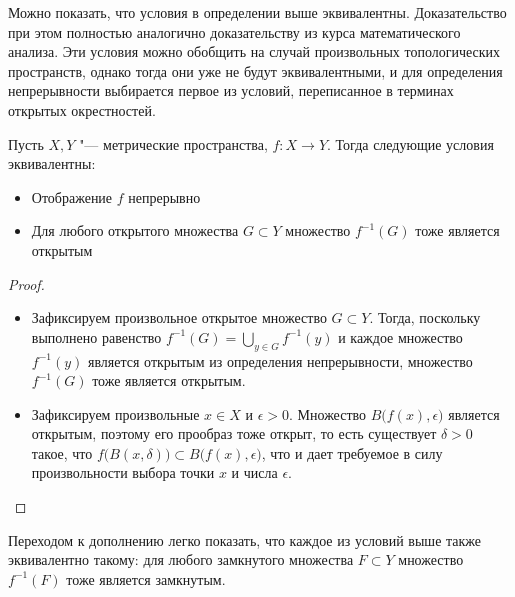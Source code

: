 \begin{note}
	Можно показать, что условия в определении выше эквивалентны. Доказательство при этом полностью аналогично доказательству из курса математического анализа. Эти условия можно обобщить на случай произвольных топологических пространств, однако тогда они уже не будут эквивалентными, и для определения непрерывности выбирается первое из условий, переписанное в терминах открытых окрестностей.
\end{note}

\begin{theorem}\label{thm1.4}
	Пусть $X, Y$ "--- метрические пространства, $f: X \to Y$. Тогда следующие условия эквивалентны:
	\begin{itemize}
		\item Отображение $f$ непрерывно
		\item Для любого открытого множества $G \subset Y$ множество $f^{-1}(G)$ тоже является открытым
	\end{itemize}
\end{theorem}

\begin{proof}~
	\begin{itemize}
		\item{}Зафиксируем произвольное открытое множество $G \subset Y$. Тогда, поскольку выполнено равенство $f^{-1}(G) = \bigcup_{y \in G}f^{-1}(y)$ и каждое множество $f^{-1}(y)$ является открытым из определения непрерывности, множество $f^{-1}(G)$ тоже является открытым.

		\item{}Зафиксируем произвольные $x \in X$ и $\epsilon > 0$. Множество $B\big(f(x), \epsilon\big)$ является открытым, поэтому его прообраз тоже открыт, то есть существует $\delta > 0$ такое, что $f\big(B(x, \delta)\big) \subset B\big(f(x), \epsilon\big)$, что и дает требуемое в силу произвольности выбора точки $x$ и числа $\epsilon$.\qedhere
	\end{itemize}
\end{proof}

\begin{note}
	Переходом к дополнению легко показать, что каждое из условий выше также эквивалентно такому: для любого замкнутого множества $F \subset Y$ множество $f^{-1}(F)$ тоже является замкнутым.
\end{note}